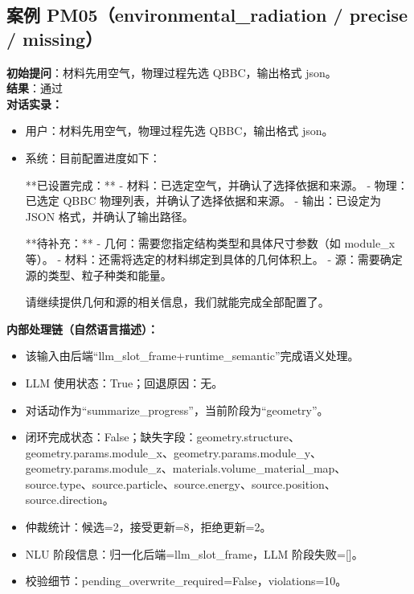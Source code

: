 \documentclass[11pt]{ctexart}
\begin{document}
\subsection{案例 PM05（environmental\_radiation / precise / missing）}
\textbf{初始提问}：材料先用空气，物理过程先选 QBBC，输出格式 json。\\
\textbf{结果}：通过\\
\textbf{对话实录：}
\begin{itemize}
\item 用户：材料先用空气，物理过程先选 QBBC，输出格式 json。
\item 系统：目前配置进度如下：

**已设置完成：**
- 材料：已选定空气，并确认了选择依据和来源。
- 物理：已选定 QBBC 物理列表，并确认了选择依据和来源。
- 输出：已设定为 JSON 格式，并确认了输出路径。

**待补充：**
- 几何：需要您指定结构类型和具体尺寸参数（如 module\_x 等）。
- 材料：还需将选定的材料绑定到具体的几何体积上。
- 源：需要确定源的类型、粒子种类和能量。

请继续提供几何和源的相关信息，我们就能完成全部配置了。
\end{itemize}
\textbf{内部处理链（自然语言描述）：}
\begin{itemize}
\item 该输入由后端“llm\_slot\_frame+runtime\_semantic”完成语义处理。
\item LLM 使用状态：True；回退原因：无。
\item 对话动作为“summarize\_progress”，当前阶段为“geometry”。
\item 闭环完成状态：False；缺失字段：geometry.structure、geometry.params.module\_x、geometry.params.module\_y、geometry.params.module\_z、materials.volume\_material\_map、source.type、source.particle、source.energy、source.position、source.direction。
\item 仲裁统计：候选=2，接受更新=8，拒绝更新=2。
\item NLU 阶段信息：归一化后端=llm\_slot\_frame，LLM 阶段失败=[]。
\item 校验细节：pending\_overwrite\_required=False，violations=10。
\end{itemize}
\end{document}
